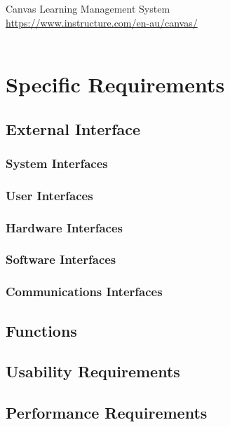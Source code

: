 \documentclass[ 10pt]{report}
\begin{document}
    \noindent Canvas Learning Management System \\
    \href{https://www.instructure.com/en-au/canvas/}{https://www.instructure.com/en-au/canvas/} \\\\
    \pagebreak

    \chapter{Specific Requirements}
        \section{External Interface}
            \subsection{System Interfaces}
            \subsection{User Interfaces}
            \subsection{Hardware Interfaces}
            \subsection{Software Interfaces}
            \subsection{Communications Interfaces}
        \section{Functions}
        \section{Usability Requirements}
        \section{Performance Requirements}
\end{document}
